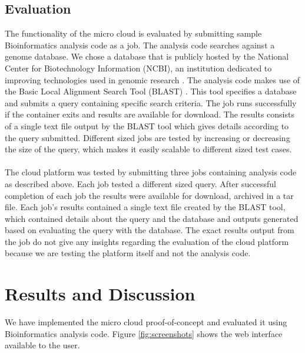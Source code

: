 \documentclass{sig-alternate-05-2015}
\begin{document}
\subsection{Evaluation}
The functionality of the micro cloud is evaluated by submitting sample Bioinformatics analysis code as a job. The analysis code searches against a genome database. We chose a database that is publicly hosted by the National Center for Biotechnology Information (NCBI), an institution dedicated to improving technologies used in genomic research \cite{pruitt2005ncbi}. The analysis code makes use of the Basic Local Alignment Search Tool (BLAST) \cite{camacho2009blast}. This tool specifies a database and submits a query containing specific search criteria. The job runs successfully if the container exits and results are available for download. The results consists of a single text file output by the BLAST tool which gives details according to the query submitted. Different sized jobs are tested by increasing or decreasing the size of the query, which makes it easily scalable to different sized test cases.
\\\\
The cloud platform was tested by submitting three jobs containing analysis code as described above. Each job tested a different sized query. After successful completion of each job the results were available for download, archived in a tar file. Each job's results contained a single text file created by the BLAST tool, which contained details about the query and the database and outputs generated based on evaluating the query with the database. The exact results output from the job do not give any insights regarding the evaluation of the cloud platform because we are testing the platform itself and not the analysis code. 


\section{Results and Discussion}
We have implemented the micro cloud proof-of-concept and evaluated it using Bioinformatics analysis code. Figure \ref{fig:screenshots} shows the web interface available to the user. 
\end{document}
